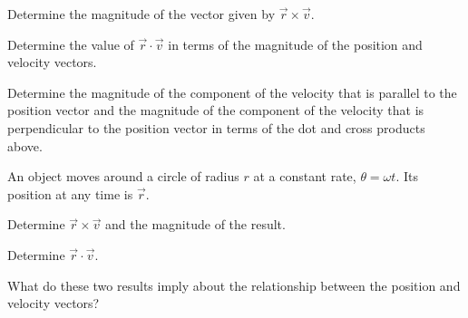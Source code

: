 \begin{problem}
\begin{subproblem}
    \vfill

  \item Determine the magnitude of the vector given by
    $\vec{r}\times\vec{v}$.

    \vfill

  \item Determine the value of $\vec{r}\cdot\vec{v}$ in terms of the
    magnitude of the position and velocity vectors. 

    \vfill

  \item Determine the magnitude of the component of the velocity that
    is parallel to the position vector and the magnitude of the
    component of the velocity that is perpendicular to the position
    vector in terms of the dot and cross products above.

    \vfill

  \end{subproblem}
  \clearpage
\item An object moves around a circle of radius $r$  at a constant
  rate, $\theta=\omega t$. Its position at any time is $\vec{r}$.
  \begin{subproblem}
  \item Determine $\vec{r}\times\vec{v}$ and the magnitude of the
    result.

    \vfill

  \item Determine  $\vec{r}\cdot\vec{v}$.

    \vfill

  \item What do these two results imply about the relationship between
    the position and velocity vectors?

    \vfill

  \end{subproblem}
\end{problem}

\postClass

